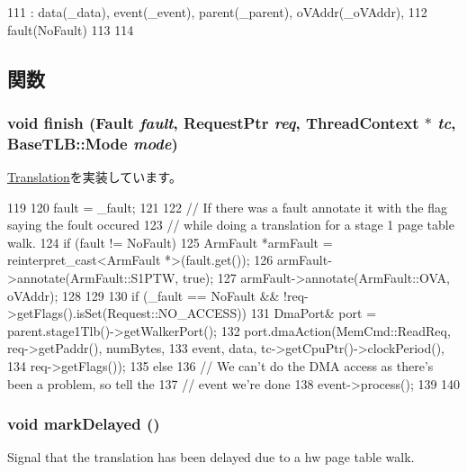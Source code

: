 \begin{DoxyCode}
111     : data(_data), event(_event), parent(_parent), oVAddr(_oVAddr),
112     fault(NoFault)
113 {
114 }
\end{DoxyCode}


\subsection{関数}
\hypertarget{classArmISA_1_1Stage2MMU_1_1Stage2Translation_a01e7d945def8d2e5df87a169954fa89f}{
\subsubsection[{finish}]{\setlength{\rightskip}{0pt plus 5cm}void finish ({\bf Fault} {\em fault}, \/  {\bf RequestPtr} {\em req}, \/  {\bf ThreadContext} $\ast$ {\em tc}, \/  {\bf BaseTLB::Mode} {\em mode})}}
\label{classArmISA_1_1Stage2MMU_1_1Stage2Translation_a01e7d945def8d2e5df87a169954fa89f}


\hyperlink{classBaseTLB_1_1Translation_a5698e0a932f298729d10355d4384e565}{Translation}を実装しています。


\begin{DoxyCode}
119 {
120     fault = _fault;
121 
122     // If there was a fault annotate it with the flag saying the foult occured
123     // while doing a translation for a stage 1 page table walk.
124     if (fault != NoFault) {
125         ArmFault *armFault = reinterpret_cast<ArmFault *>(fault.get());
126         armFault->annotate(ArmFault::S1PTW, true);
127         armFault->annotate(ArmFault::OVA, oVAddr);
128     }
129 
130     if (_fault == NoFault && !req->getFlags().isSet(Request::NO_ACCESS)) {
131         DmaPort& port = parent.stage1Tlb()->getWalkerPort();
132         port.dmaAction(MemCmd::ReadReq, req->getPaddr(), numBytes,
133                        event, data, tc->getCpuPtr()->clockPeriod(),
134                        req->getFlags());
135     } else {
136         // We can't do the DMA access as there's been a problem, so tell the
137         // event we're done
138         event->process();
139     }
140 }
\end{DoxyCode}
\hypertarget{classArmISA_1_1Stage2MMU_1_1Stage2Translation_ad1fd11d1e352cfc4b329d29b46a19fc4}{
\subsubsection[{markDelayed}]{\setlength{\rightskip}{0pt plus 5cm}void markDelayed ()}}
\label{classArmISA_1_1Stage2MMU_1_1Stage2Translation_ad1fd11d1e352cfc4b329d29b46a19fc4}
Signal that the translation has been delayed due to a hw page table walk. 

